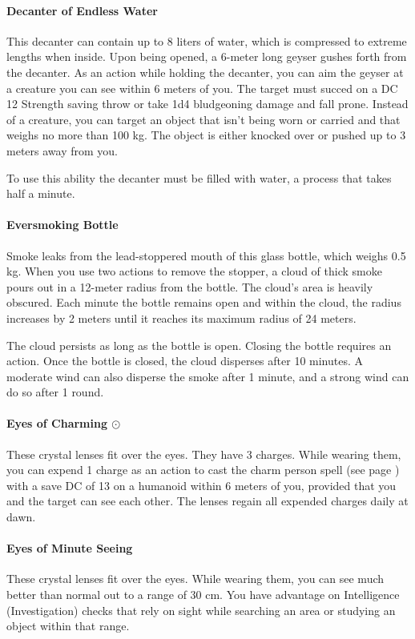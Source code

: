 \paragraph{Decanter of Endless Water}
    This decanter can contain up to 8 liters of water, which is compressed to extreme lengths when inside.
    Upon being opened, a 6-meter long geyser gushes forth from the decanter.
    As an action while holding the decanter, you can aim the geyser at a creature you can see within 6 meters of you.
    The target must succed on a DC 12 Strength saving throw or take 1d4 bludgeoning damage and fall prone.
    Instead of a creature, you can target an object that isn't being worn or carried and that weighs no more than 100 kg.
    The object is either knocked over or pushed up to 3 meters away from you.

    To use this ability the decanter must be filled with water, a process that takes half a minute.
\paragraph{Eversmoking Bottle}
    Smoke leaks from the lead-stoppered mouth of this glass bottle, which weighs 0.5 kg.
    When you use two actions to remove the stopper, a cloud of thick smoke pours out in a 12-meter radius from the bottle.
    The cloud's area is heavily obscured.
    Each minute the bottle remains open and within the cloud, the radius increases by 2 meters until it reaches its maximum radius of 24 meters.

    The cloud persists as long as the bottle is open.
    Closing the bottle requires an action.
    Once the bottle is closed, the cloud disperses after 10 minutes.
    A moderate wind can also disperse the smoke after 1 minute, and a strong wind can do so after 1 round.
\paragraph{Eyes of Charming $\odot$}
    These crystal lenses fit over the eyes.
    They have 3 charges.
    While wearing them, you can expend 1 charge as an action to cast the charm person spell (see page \pageref{spell::charmperson}) with a save DC of 13 on a humanoid within 6 meters of you, provided that you and the target can see each other.
    The lenses regain all expended charges daily at dawn.
\paragraph{Eyes of Minute Seeing}
    These crystal lenses fit over the eyes.
    While wearing them, you can see much better than normal out to a range of 30 cm.
    You have advantage on Intelligence (Investigation) checks that rely on sight while searching an area or studying an object within that range.
